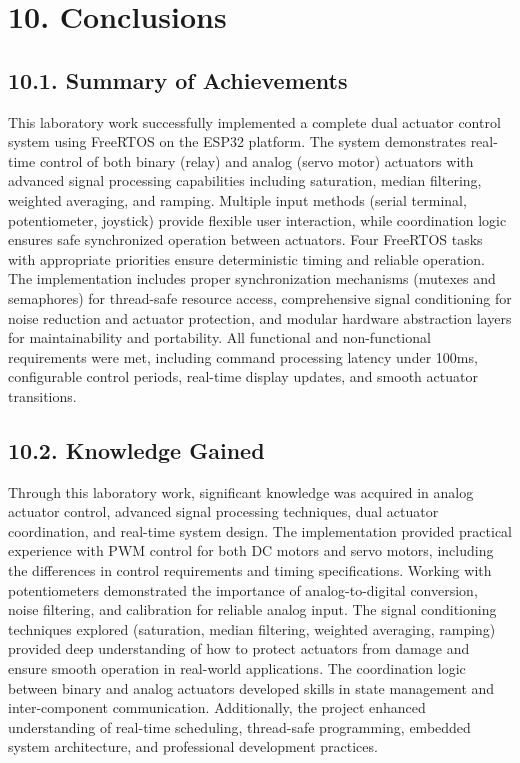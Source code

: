 \documentclass[12pt]{article}
\begin{document}
\section*{10. Conclusions}

\subsection*{10.1. Summary of Achievements}

This laboratory work successfully implemented a complete dual actuator control system using FreeRTOS on the ESP32 platform. The system demonstrates real-time control of both binary (relay) and analog (servo motor) actuators with advanced signal processing capabilities including saturation, median filtering, weighted averaging, and ramping. Multiple input methods (serial terminal, potentiometer, joystick) provide flexible user interaction, while coordination logic ensures safe synchronized operation between actuators. Four FreeRTOS tasks with appropriate priorities ensure deterministic timing and reliable operation. The implementation includes proper synchronization mechanisms (mutexes and semaphores) for thread-safe resource access, comprehensive signal conditioning for noise reduction and actuator protection, and modular hardware abstraction layers for maintainability and portability. All functional and non-functional requirements were met, including command processing latency under 100ms, configurable control periods, real-time display updates, and smooth actuator transitions.

\subsection*{10.2. Knowledge Gained}

Through this laboratory work, significant knowledge was acquired in analog actuator control, advanced signal processing techniques, dual actuator coordination, and real-time system design. The implementation provided practical experience with PWM control for both DC motors and servo motors, including the differences in control requirements and timing specifications. Working with potentiometers demonstrated the importance of analog-to-digital conversion, noise filtering, and calibration for reliable analog input. The signal conditioning techniques explored (saturation, median filtering, weighted averaging, ramping) provided deep understanding of how to protect actuators from damage and ensure smooth operation in real-world applications. The coordination logic between binary and analog actuators developed skills in state management and inter-component communication. Additionally, the project enhanced understanding of real-time scheduling, thread-safe programming, embedded system architecture, and professional development practices.
\end{document}
